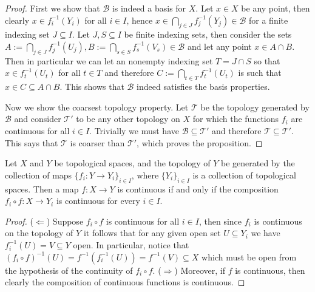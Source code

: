 \begin{proof}
  First we show that \(\mathcal B\) is indeed a basis for \(X\). Let \(x \in X\)
  be any point, then clearly \(x \in f_i^{-1}(Y_i)\) for all \(i \in I\), hence
  \(x \in \bigcap_{j \in  J} f_j^{-1}(Y_j) \in \mathcal B\) for a finite
  indexing set \(J \subseteq I\).
  Let \(J, S \subseteq I\) be finite indexing sets, then consider the sets
  \(A := \bigcap_{j \in J} f_j^{-1}(U_j), B := \bigcap_{s \in S} f_s^{-1}(V_s) \in
  \mathcal B\) and let any point \(x \in A \cap B\). Then in particular we can
  let an nonempty indexing set \(T = J \cap S\) so that \(x \in f_t^{-1}(U_t)\)
  for all \(t \in T\) and therefore \(C := \bigcap_{t \in  T} f_t^{-1}(U_t)\) is
  such that \(x \in C \subseteq A \cap B\). This shows that \(\mathcal B\)
  indeed satisfies the basis properties.

  Now we show the coarsest topology property. Let \(\mathcal T\) be the topology
  generated by \(\mathcal B\) and consider \(\mathcal T'\) to be any other
  topology on \(X\) for which the functions \(f_i\) are continuous for all \(i
  \in I\). Trivially we must have \(\mathcal B \subseteq \mathcal T'\) and
  therefore \(\mathcal T \subseteq \mathcal T'\). This says that \(\mathcal T\)
  is coarser than \(\mathcal T'\), which proves the proposition.
\end{proof}

\begin{proposition}
  Let \(X\) and \(Y\) be topological spaces, and the topology of \(Y\) be
  generated by the collection of maps \(\{f_i : Y \to Y_i\}_{i \in I}\), where
  \(\{Y_i\}_{i \in I}\) is a collection of topological spaces. Then a map \(f :
  X \to Y\) is continuous if and only if the composition \(f_i \circ f : X \to
  Y_i\) is continuous for every \(i \in I\).
\end{proposition}

\begin{proof}
  (\(\Leftarrow\)) Suppose \(f_i \circ f\) is continuous for all \(i \in I\),
  then since \(f_i\) is continuous on the topology of \(Y\) it follows that for
  any given open set \(U \subseteq Y_i\) we have \(f_i^{-1}(U) = V \subseteq Y\)
  open. In particular, notice that \((f_i \circ f)^{-1}(U) = f^{-1}(f_i^{-1}(U))
  = f^{-1}(V) \subseteq X\) which must be open from the hypothesis of the
  continuity of \(f_i \circ f\). (\(\Rightarrow\)) Moreover, if \(f\) is
  continuous, then clearly the composition of continuous functions is
  continuous.
\end{proof}

